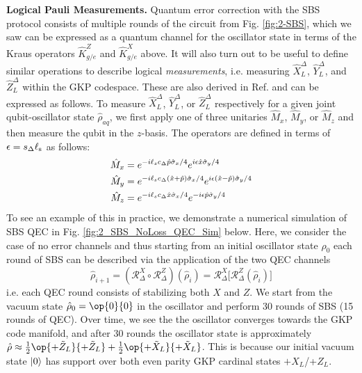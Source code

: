 \noindent\textbf{Logical Pauli Measurements.} Quantum error correction with the SBS protocol consists of multiple rounds of the circuit from Fig. \ref{fig:2-SBS}, which we saw can be expressed as a quantum channel for the oscillator state in terms of the Kraus operators $\hat{K}_{g/e}^{Z}$ and $\hat{K}_{g/e}^{X}$ above. It will also turn out to be useful to define similar operations to describe logical \textit{measurements}, i.e. measuring $\hat{X}_L^\Delta$, $\hat{Y}_L^\Delta$, and $\hat{Z}_L^\Delta$ within the GKP codespace. These are also derived in Ref. \cite{royer2020gkp} and can be expressed as follows. To measure $\hat{X}_L^\Delta$, $\hat{Y}_L^\Delta$, or $\hat{Z}_L^\Delta$ respectively for a given joint qubit-oscillator state $\hat{\rho}_{aq}$, we first apply one of three unitaries $\hat{M}_x$, $\hat{M}_y$, or $\hat{M}_z$ and then measure the qubit in the $z$-basis. The operators are defined in terms of $\epsilon = s_\Delta \ell_{\rm s}$ as follows:
\begin{align}
    \begin{split}
        \hat{M}_x &= e^{-i\ell_s c_\Delta \hat{p}\hat{\sigma}_x / 4} e^{i \epsilon \hat{x}\hat{\sigma}_y/4} \\
        \hat{M}_y &= e^{-i\ell_s c_\Delta (\hat{x}+\hat{p})\hat{\sigma}_x / 4} e^{i \epsilon (\hat{x}-\hat{p})\hat{\sigma}_y/4} \\
        \hat{M}_z &= e^{-i\ell_s c_\Delta \hat{x}\hat{\sigma}_x / 4} e^{-i \epsilon \hat{p}\hat{\sigma}_y/4}
    \end{split}
\end{align}
To see an example of this in practice, we demonstrate a numerical simulation of SBS QEC in Fig. \ref{fig:2_SBS_NoLoss_QEC_Sim} below. Here, we consider the case of no error channels  and thus starting from an initial oscillator state $\hat{\rho}_0$ each round of SBS can be described via the application of the two QEC channels
\begin{equation}
    \hat{\rho}_{i + 1} = (\mathcal{R}_\Delta^X \circ \mathcal{R}_\Delta^Z)(\hat{\rho}_i) = \mathcal{R}_\Delta^X\Big[\mathcal{R}_\Delta^Z(\hat{\rho}_i)\Big]
\end{equation}
i.e. each QEC round consists of stabilizing both $X$ and $Z$. We start from the vacuum state $\hat{\rho}_0 = \op{0}{0}$ in the oscillator and perform 30 rounds of SBS (15 rounds of QEC). Over time, we see the the oscillator converges towards the GKP code manifold, and after 30 rounds the oscillator state is approximately $\hat{\rho} \approx \frac{1}{2}\op{+\tilde{Z}_L}{+\tilde{Z}_L} + \frac{1}{2}\op{+\tilde{X}_L}{+\tilde{X}_L}$. This is because our initial vacuum state $\lvert0\rangle$ has support over both even parity GKP cardinal states $+X_L$/+$Z_L$. 

